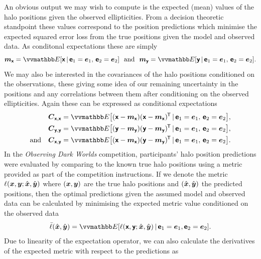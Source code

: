 An obvious output we may wish to compute is the expected (mean) values of the halo positions given the observed ellipticities. From a decision theoretic standpoint these values correspond to the position predictions which minimise the expected squared error loss from the true positions given the model and observed data. 
As conditonal expectations these are simply
\begin{equation}
  \vct{m}_{\rvct{x}} = \expc{\rvct{x} \gvn \rvct{e}_1 = \vct{e}_1,\,\rvct{e}_2 = \vct{e}_2}
  ~~\textrm{and}~~
  \vct{m}_{\rvct{y}} = \expc{\rvct{y} \gvn \rvct{e}_1 = \vct{e}_1,\,\rvct{e}_2 = \vct{e}_2}.
\end{equation}
We may also be interested in the covariances of the halo positions conditioned on the observations, these giving some idea of our remaining uncertainty in the positions and any correlations between them after conditioning on the observed ellipticities. Again these can be expressed as conditional expectations
\begin{align}
  \nonumber
  \mtx{C}_{\rvct{x},\rvct{x}} &=
  \expc{
    (\rvct{x}-\vct{m}_{\rvct{x}})(\rvct{x}-\vct{m}_{\rvct{x}})\tr
    \gvn \rvct{e}_1 = \vct{e}_1,\,\rvct{e}_2 = \vct{e}_2
  },
  \\
  \mtx{C}_{\rvct{y},\rvct{y}} &=
  \expc{
    (\rvct{y}-\vct{m}_{\rvct{y}})(\rvct{y}-\vct{m}_{\rvct{y}})\tr
    \gvn \rvct{e}_1 = \vct{e}_1,\,\rvct{e}_2 = \vct{e}_2
  },
  \\
  \nonumber
  \textrm{and}\quad
  \mtx{C}_{\rvct{x},\rvct{y}} &=
  \expc{
    (\rvct{x}-\vct{m}_{\rvct{x}})(\rvct{y}-\vct{m}_{\rvct{y}})\tr
    \gvn \rvct{e}_1 = \vct{e}_1,\,\rvct{e}_2 = \vct{e}_2
  }.
\end{align}
In the \emph{Observing Dark Worlds} competition, participants' halo position predictions were evaluated by comparing to the known true halo positions using a metric provided as part of the competition instructions. If we denote the metric $\ell(\boldsymbol{x},\boldsymbol{y};\hat{\boldsymbol{x}},\hat{\boldsymbol{y}})$ where $(\boldsymbol{x},\boldsymbol{y})$ are the true halo positions and $(\hat{\boldsymbol{x}},\hat{\boldsymbol{y}})$ the predicted positions, then the optimal predictions given the assumed model and observed data can be calculated by minimising the expected metric value conditioned on the observed data
\begin{equation}
  \bar{\ell}(\hat{\vct{x}},\hat{\vct{y}}) =
  \expc{\ell(\rvct{x},\rvct{y};\hat{\vct{x}},\hat{\vct{y}}) \gvn \rvct{e}_1 =\vct{e}_1, \rvct{e}_2=\vct{e}_2}.
\end{equation}
Due to linearity of the expectation operator, we can also calculate the derivatives of the expected metric with respect to the predictions as
